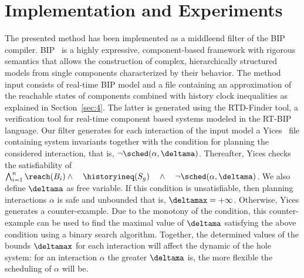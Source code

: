 \section{Implementation and Experiments}\label{sec:5}

The presented method has been implemented as a middleend filter of the BIP compiler. BIP~\cite{Basu:BIP} is a highly expressive, component-based
framework with rigorous semantics that allows the construction of complex, hierarchically structured models from single components characterized by their behavior.
The method input consists of real-time BIP model
and a file containing an approximation of the reachable states of components combined with history clock inequalities as explained in 
Section~\ref{sec:4}. The latter is generated using the RTD-Finder tool, a verification tool for real-time component based
systems modeled in the RT-BIP language. Our filter generates for each interaction of the input model a Yices~\cite{yices} file containing system invariants together with the condition for
planning the considered interaction, that is, $\neg\sched(\alpha,\deltama)$. Thereafter, Yices checks the satisfiability of
$\bigwedge_{i=1}^n \reach(B_i)\wedge\quad\historyineq(S_g)\quad\wedge\quad\neg\sched(\alpha,\deltama)$. We also define $\deltama$ as free variable.
If this condition is unsatisfiable, then planning interactions
$\alpha$ is safe and unbounded that is, $\deltamax=+\infty$. Otherwise, Yices generates a counter-example. Due to the monotony of the condition, this counter-example can be
used to find the maximal value of $\deltama$  satisfying the above condition using a binary search algorithm.
Together, the determined values of the bounds $\deltamax$ for each interaction will affect the dynamic of the hole system: for an interaction 
$\alpha$ the greater $\deltama$ is, the more flexible the scheduling of $\alpha$ will be. 

